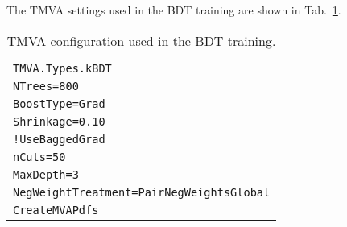 

The TMVA settings used in the BDT training are shown in Tab.~\ref{tab:bdtsettings}.

\begin{table}
\centering
\begin{tabular}{l}
  \hline
  \verb|TMVA.Types.kBDT| \\
  \verb|NTrees=800| \\
  \verb|BoostType=Grad| \\
  \verb|Shrinkage=0.10| \\
  \verb|!UseBaggedGrad| \\
  \verb|nCuts=50| \\
  \verb|MaxDepth=3| \\
  \verb|NegWeightTreatment=PairNegWeightsGlobal| \\
  \verb|CreateMVAPdfs| \\
  \hline
\end{tabular}
\caption[TMVA configuration used in the BDT training.]{TMVA configuration used in the BDT training.}\label{tab:bdtsettings}
\end{table}


